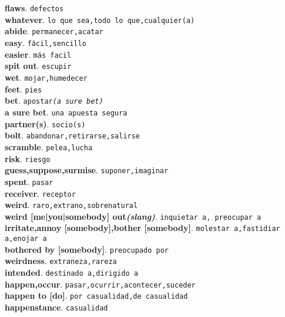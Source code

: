\documentclass[twocolumn]{article}
\begin{document}
	\textsf{\textbf{flaws}}. \texttt{defectos}\\
	\textsf{\textbf{whatever}}. \texttt{lo que sea,todo lo que,cualquier(a)}\\
	\textsf{\textbf{abide}}. \texttt{permanecer,acatar}\\
	\textsf{\textbf{easy}}. \texttt{f\'acil,sencillo}\\
	\textsf{\textbf{easier}}. \texttt{m\'as facil}\\
	\textsf{\textbf{spit out}}. \texttt{escupir}\\
	\textsf{\textbf{wet}}. \texttt{mojar,humedecer}\\
	\textsf{\textbf{feet}}. \texttt{pies}\\
	\textsf{\textbf{bet}}. \texttt{apostar{\scriptsize \textsl{(a sure bet)}}}\\
	\textsf{\textbf{a sure bet}}. \texttt{una apuesta segura}\\
	\textsf{\textbf{partner(s)}}. \texttt{socio(s)}\\
	\textsf{\textbf{bolt}}. \texttt{abandonar,retirarse,salirse}\\
	\textsf{\textbf{scramble}}. \texttt{pelea,lucha}\\
	\textsf{\textbf{risk}}. \texttt{riesgo}\\
	\textsf{\textbf{guess,suppose,surmise}}. \texttt{suponer,imaginar}\\
	\textsf{\textbf{spent}}. \texttt{pasar}\\
	\textsf{\textbf{receiver}}. \texttt{receptor}\\
	\textsf{\textbf{weird}}. \texttt{raro,extrano,sobrenatural}\\
  \textsf{\textbf{weird [me|you|somebody] out{\scriptsize \textsl{(slang)}}}}. \texttt{inquietar a, preocupar a}\\
  \textsf{\textbf{irritate,annoy [somebody],bother [somebody]}}. \texttt{molestar a,fastidiar a,enojar a}\\
  \textsf{\textbf{bothered by [somebody]}}. \texttt{preocupado por}\\
	\textsf{\textbf{weirdness}}. \texttt{extraneza,rareza}\\
	\textsf{\textbf{intended}}. \texttt{destinado a,dirigido a}\\
	\textsf{\textbf{happen,occur}}. \texttt{pasar,ocurrir,acontecer,suceder}\\
  \textsf{\textbf{happen to [do]}}. \texttt{por casualidad,de casualidad}\\
	\textsf{\textbf{happenstance}}. \texttt{casualidad}\\
\end{document}
